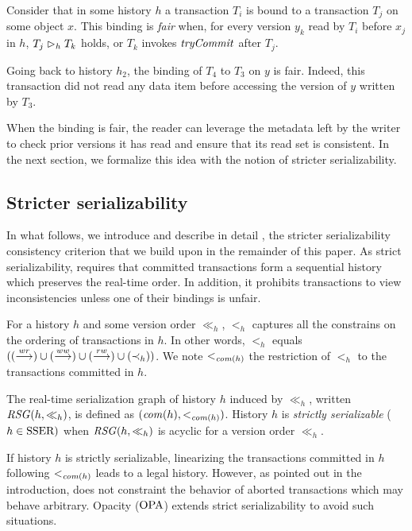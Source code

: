 \begin{definition}
  Consider that in some history $h$ a transaction $T_i$ is bound to a transaction $T_j$ on some object $x$.
  This binding is \emph{fair} when, for every version $y_k$ read by $T_i$ before $x_j$ in $h$, $T_j \depends_h T_k$ holds, or $T_k$ invokes $\stmTryCommitFunction$ after $T_j$.
\end{definition}

Going back to history $h_2$, the binding of $T_4$ to $T_3$ on $y$ is fair.
Indeed, this transaction did not read any data item before accessing the version of $y$ written by $T_3$.

When the binding is fair, the reader can leverage the metadata left by the writer to check prior versions it has read and ensure that its read set is consistent.
In the next section, we formalize this idea with the notion of stricter serializability.

\subsection{Stricter serializability}

In what follows, we introduce and describe in detail \SPSER, the stricter serializability consistency criterion that we build upon in the remainder of this paper.
As strict serializability, \SPSER requires that committed transactions form a sequential history which preserves the real-time order.
In addition, it prohibits transactions to view inconsistencies unless one of their bindings is unfair.

For a history $h$ and some version order $\ll_h$, $<_h$ captures all the constrains on the ordering of transactions in $h$.
In other words, $<_h$ equals $((\wrdep) \union (\wwdep) \union (\adep) \union (\hb_h))$.
We note $<_{\committed{h}}$ the restriction of $<_{h}$ to the transactions committed in $h$.

\begin{definition}
  The real-time serialization graph of history $h$ induced by $\ll_h$, written $\RSG(h,\ll_h)$, is defined as $(\committed{h},<_{\committed{h}})$.  
  History $h$ is \emph{strictly serializable} ($h \in \SSER)$ when $\RSG(h,\ll_h)$ is acyclic for a version order $\ll_h$.
\end{definition}

If history $h$ is strictly serializable, linearizing the transactions committed in $h$ following $<_{\committed{h}}$ leads to a legal history.
However, as pointed out in the introduction, \SSER does not constraint the behavior of aborted transactions which may behave arbitrary.
Opacity ($\OPA$) extends strict serializability to avoid such situations.


